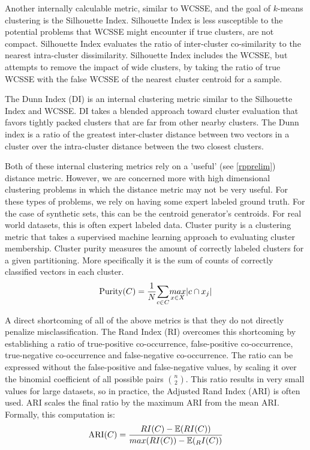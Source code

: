 Another internally calculable metric, similar to WCSSE, and the goal of $k$-means clustering is
the Silhouette Index.  Silhouette Index is less susceptible to the potential problems that WCSSE
might encounter if true clusters, are not compact.  Silhouette Index evaluates the ratio of
inter-cluster co-similarity to the nearest intra-cluster dissimilarity.  Silhouette Index includes the
WCSSE, but attempts to remove the impact of wide clusters, by taking the ratio of true WCSSE with
the false WCSSE of the nearest cluster centroid for a sample.

The Dunn Index (DI) is an internal clustering metric similar to the Silhouette Index and WCSSE.  DI
takes a blended approach toward cluster evaluation that favors tightly packed clusters that are far
from other nearby clusters.  The Dunn index is a ratio of the greatest inter-cluster distance between
two vectors in a cluster over the intra-cluster distance between the two closest clusters.

Both of these internal clustering metrics rely on a 'useful' (see \ref{rpprelim}) distance metric.
However, we are concerned more with high dimensional clustering problems in which the distance
metric may not be very useful.  For these types of problems, we rely on having some expert labeled
ground truth.  For the case of synthetic sets, this can be the centroid generator's centroids.  For
real world datasets, this is often expert labeled data.  Cluster purity is a clustering metric that
takes a supervised machine learning approach to evaluating cluster membership.  Cluster purity
measures the amount of correctly labeled clusters for a given partitioning.  More specifically it is
the sum of counts of correctly classified vectors in each cluster.
$$
\text{Purity}(C) = {{1}\over{N}}{\underset{c\in C}{\sum}} \underset{x\in X}{max} |c \cap x_j |
$$

A direct shortcoming of all of the above metrics is that they do not directly penalize
misclassification.  The Rand Index (RI) overcomes this shortcoming by establishing a ratio of
true-positive co-occurrence, false-positive co-occurrence, true-negative co-occurrence and
false-negative co-occurrence.  The ratio can be expressed without the false-positive and
false-negative values, by scaling it over the binomial coefficient of all possible pairs
$\binom{n}{2}$.  This ratio results in very small values for large datasets, so in practice, the
Adjusted Rand Index (ARI) is often used.  ARI scales the final ratio by the maximum ARI from the
mean ARI.  Formally, this computation is:
$$
\text{ARI}(C) = {{RI(C) - \mathbb{E}(RI(C))} \over {max(RI(C)) - \mathbb{E}(_RI(C))}}\\
$$

